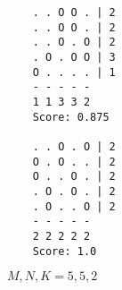 \begin{figure}[h!]
    \begin{verbatim}
    . . O O . | 2
    . . O O . | 2
    . . O . O | 2
    . O . O O | 3
    O . . . . | 1
    - - - - -
    1 1 3 3 2
    Score: 0.875

    . . O . O | 2
    O . O . . | 2
    O . . O . | 2
    . O . O . | 2
    . O . . O | 2
    - - - - -
    2 2 2 2 2
    Score: 1.0
    \end{verbatim}
\caption{$M, N, K = 5, 5, 2$}
\end{figure}
